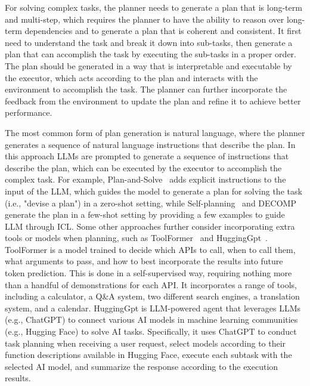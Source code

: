For solving complex tasks, the planner needs to generate a plan that is long-term and multi-step, which requires the planner to have the ability to reason over long-term dependencies and to generate a plan that is coherent and consistent.
It first need to understand the task and break it down into sub-tasks, then generate a plan that can accomplish the task by executing the sub-tasks in a proper order.
The plan should be generated in a way that is interpretable and executable by the executor, which acts according to the plan and interacts with the environment to accomplish the task.
The planner can further incorporate the feedback from the environment to update the plan and refine it to achieve better performance.

The most common form of plan generation is natural language, where the planner generates a sequence of natural language instructions that describe the plan.
In this approach LLMs are prompted to generate a sequence of instructions that describe the plan, which can be executed by the executor to accomplish the complex task.
For example, Plan-and-Solve~\cite{wang2023plan} adds explicit instructions to the input of the LLM, which guides the model to generate a plan for solving the task (i.e., "devise a plan") in a zero-shot setting, while Self-planning~\cite{jiang2024selfplanning} and DECOMP~\cite{khot2022decomposed} generate the plan in a few-shot setting by providing a few examples to guide LLM through ICL\@.
Some other approaches further consider incorporating extra tools or models when planning, such as ToolFormer~\cite{schick2023toolformer} and HuggingGpt~\cite{shen2023hugginggpt}.
ToolFormer is a model trained to decide which APIs to call, when to call them, what arguments to pass, and how to best incorporate the results into future token prediction.
This is done in a self-supervised way, requiring nothing more than a handful of demonstrations for each API. It incorporates a range of tools, including a calculator, a Q\&A system, two different search engines, a translation system, and a calendar.
HuggingGpt is LLM-powered agent that leverages LLMs (e.g., ChatGPT) to connect various AI models in machine learning communities (e.g., Hugging Face) to solve AI tasks.
Specifically, it uses ChatGPT to conduct task planning when receiving a user request, select models according to their function descriptions available in Hugging Face, execute each subtask with the selected AI model, and summarize the response according to the execution results.

